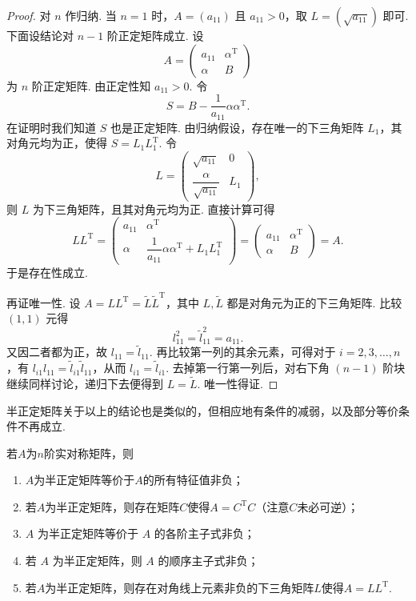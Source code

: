\begin{proof}
    对 $n$ 作归纳. 当 $n=1$ 时，$A=(a_{11})$ 且 $a_{11}>0$，取 $L=(\sqrt{a_{11}})$ 即可. 下面设结论对 $n-1$ 阶正定矩阵成立. 设
    \[
        A=\begin{pmatrix}
            a_{11} & \alpha^\mathrm{T} \\
            \alpha & B
        \end{pmatrix}
    \]
    为 $n$ 阶正定矩阵. 由正定性知 $a_{11}>0$. 令
    \[
        S=B-\frac{1}{a_{11}}\alpha\alpha^\mathrm{T}.
    \]
    在证明时我们知道 $S$ 也是正定矩阵. 由归纳假设，存在唯一的下三角矩阵 $L_1$，其对角元均为正，使得 $S=L_1L_1^\mathrm{T}$. 令
    \[
        L=\begin{pmatrix}
            \sqrt{a_{11}} & 0 \\
            \dfrac{\alpha}{\sqrt{a_{11}}} & L_1
        \end{pmatrix},
    \]
    则 $L$ 为下三角矩阵，且其对角元均为正. 直接计算可得
    \[
        LL^\mathrm{T}
        =
        \begin{pmatrix}
            a_{11} & \alpha^\mathrm{T} \\
            \alpha & \dfrac{1}{a_{11}}\alpha\alpha^\mathrm{T}+L_1L_1^\mathrm{T}
        \end{pmatrix}
        =
        \begin{pmatrix}
            a_{11} & \alpha^\mathrm{T} \\
            \alpha & B
        \end{pmatrix}
        =A.
    \]
    于是存在性成立.

    再证唯一性. 设 $A=LL^\mathrm{T}=\widetilde{L}\widetilde{L}^\mathrm{T}$，其中 $L,\widetilde{L}$ 都是对角元为正的下三角矩阵. 比较 $(1,1)$ 元得
    \[
        l_{11}^2=\widetilde{l}_{11}^2=a_{11}.
    \]
    又因二者都为正，故 $l_{11}=\widetilde{l}_{11}$. 再比较第一列的其余元素，可得对于 $i = 2, 3, \ldots, n$，有 $l_{i1}l_{11}=\widetilde{l}_{i1}\widetilde{l}_{11}$，从而 $l_{i1}=\widetilde{l}_{i1}$. 去掉第一行第一列后，对右下角 $(n-1)$ 阶块继续同样讨论，递归下去便得到 $L=\widetilde{L}$. 唯一性得证.
\end{proof}

半正定矩阵关于以上的结论也是类似的，但相应地有条件的减弱，以及部分等价条件不再成立.
\begin{theorem}{}{}
    若$A$为$n$阶实对称矩阵，则
    \begin{enumerate}
        \item $A$为半正定矩阵等价于$A$的所有特征值非负；
        \item 若$A$为半正定矩阵，则存在矩阵$C$使得$A=C^{\mathrm{T}}C$（注意$C$未必可逆）；
        \item $A$ 为半正定矩阵等价于 $A$ 的各阶主子式非负；
        \item 若 $A$ 为半正定矩阵，则 $A$ 的顺序主子式非负；
        \item 若$A$为半正定矩阵，则存在对角线上元素非负的下三角矩阵$L$使得$A=LL^{\mathrm{T}}$.
    \end{enumerate}
\end{theorem}

